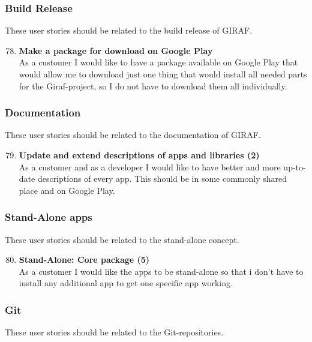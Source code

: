 \subsubsection{Build Release}
These user stories should be related to the build release of GIRAF.

\begin{enumerate}
	\setcounter{enumi}{77} %
	\item \textbf{Make a package for download on Google Play}\\
	As a customer I would like to have a package available on Google Play that would allow me to download just one thing that would install all needed parts for the Giraf-project, so I do not have to download them all individually.
\end{enumerate}

\subsubsection{Documentation}
These user stories should be related to the documentation of GIRAF.

\begin{enumerate}
	\setcounter{enumi}{78} %
	\item \textbf{Update and extend descriptions of apps and libraries (2)}\\
	As a customer and as a developer I would like to have better and more up-to-date descriptions of every app. This should be in some commonly shared place and on Google Play.
\end{enumerate}

\subsubsection{Stand-Alone apps}
These user stories should be related to the stand-alone concept.

\begin{enumerate}
	\setcounter{enumi}{79} %
	\item \textbf{Stand-Alone: Core package (5)}\\
	As a customer I would like the apps to be stand-alone so that i don't have to install any additional app to get one specific app working.
\end{enumerate}

\subsubsection{Git}
These user stories should be related to the Git-repositories.


